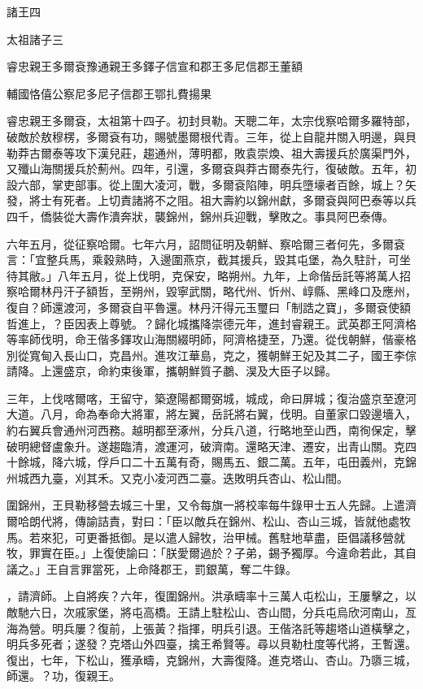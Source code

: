 
\begin{pinyinscope}
諸王四

太祖諸子三

睿忠親王多爾袞豫通親王多鐸子信宣和郡王多尼信郡王董額

輔國恪僖公察尼多尼子信郡王鄂扎費揚果

睿忠親王多爾袞，太祖第十四子。初封貝勒。天聰二年，太宗伐察哈爾多羅特部，破敵於敖穆楞，多爾袞有功，賜號墨爾根代青。三年，從上自龍井關入明邊，與貝勒莽古爾泰等攻下漢兒莊，趨通州，薄明都，敗袁崇煥、祖大壽援兵於廣渠門外，又殲山海關援兵於薊州。四年，引還，多爾袞與莽古爾泰先行，復破敵。五年，初設六部，掌吏部事。從上圍大凌河，戰，多爾袞陷陣，明兵墮壕者百餘，城上？矢發，將士有死者。上切責諸將不之阻。祖大壽約以錦州獻，多爾袞與阿巴泰等以兵四千，僑裝從大壽作潰奔狀，襲錦州，錦州兵迎戰，擊敗之。事具阿巴泰傳。

六年五月，從征察哈爾。七年六月，詔問征明及朝鮮、察哈爾三者何先，多爾袞言：「宜整兵馬，乘穀熟時，入邊圍燕京，截其援兵，毀其屯堡，為久駐計，可坐待其敝。」八年五月，從上伐明，克保安，略朔州。九年，上命偕岳託等將萬人招察哈爾林丹汗子額哲，至朔州，毀寧武關，略代州、忻州、崞縣、黑峰口及應州，復自？師還渡河，多爾袞自平魯還。林丹汗得元玉璽曰「制誥之寶」，多爾袞使額哲進上，？臣因表上尊號。？歸化城攜降崇德元年，進封睿親王。武英郡王阿濟格等率師伐明，命王偕多鐸攻山海關綴明師，阿濟格捷至，乃還。從伐朝鮮，偕豪格別從寬甸入長山口，克昌州。進攻江華島，克之，獲朝鮮王妃及其二子，國王李倧請降。上還盛京，命約束後軍，攜朝鮮質子鷫、淏及大臣子以歸。

三年，上伐喀爾喀，王留守，築遼陽都爾弼城，城成，命曰屏城；復治盛京至遼河大道。八月，命為奉命大將軍，將左翼，岳託將右翼，伐明。自董家口毀邊墻入，約右翼兵會通州河西務。越明都至涿州，分兵八道，行略地至山西，南徇保定，擊破明總督盧象升。遂趨臨清，渡運河，破濟南。還略天津、遷安，出青山關。克四十餘城，降六城，俘戶口二十五萬有奇，賜馬五、銀二萬。五年，屯田義州，克錦州城西九臺，刈其禾。又克小凌河西二臺。迭敗明兵杏山、松山間。

圍錦州，王貝勒移營去城三十里，又令每旗一將校率每牛錄甲士五人先歸。上遣濟爾哈朗代將，傳諭詰責，對曰：「臣以敵兵在錦州、松山、杏山三城，皆就他處牧馬。若來犯，可更番抵御。是以遣人歸牧，治甲械。舊駐地草盡，臣倡議移營就牧，罪實在臣。」上復使諭曰：「朕愛爾過於？子弟，錫予獨厚。今違命若此，其自議之。」王自言罪當死，上命降郡王，罰銀萬，奪二牛錄。

，請濟師。上自將疾？六年，復圍錦州。洪承疇率十三萬人屯松山，王屢擊之，以敵馳六日，次戚家堡，將屯高橋。王請上駐松山、杏山間，分兵屯烏欣河南山，亙海為營。明兵屢？復前，上張黃？指揮，明兵引退。王偕洛託等趨塔山道橫擊之，明兵多死者；遂發？克塔山外四臺，擒王希賢等。尋以貝勒杜度等代將，王暫還。復出，七年，下松山，獲承疇，克錦州，大壽復降。進克塔山、杏山。乃隳三城，師還。？功，復親王。


\end{pinyinscope}
